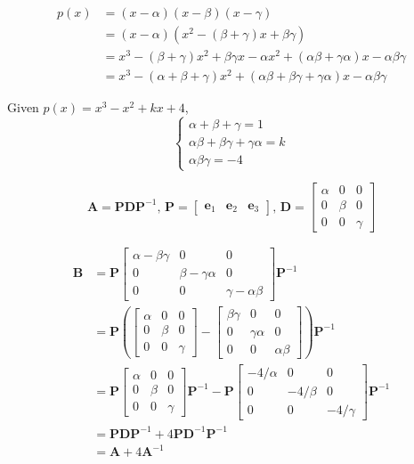 \documentclass[a4paper]{article}
\newcommand{\vv}{\mathbf}
\begin{document}
\[\begin{aligned}
	p(x)&=(x-\alpha)(x-\beta)(x-\gamma)\\
	    &=(x-\alpha)\left(x^2-(\beta+\gamma)x+\beta\gamma\right)\\
	    &=x^3-(\beta+\gamma)x^2+\beta\gamma x-\alpha x^2+(\alpha\beta+\gamma\alpha)x-\alpha\beta\gamma\\
	    &=x^3-(\alpha+\beta+\gamma)x^2+(\alpha\beta+\beta\gamma+\gamma\alpha)x-\alpha\beta\gamma
\end{aligned}\]

Given \(p(x)=x^3-x^2+kx+4\),
\[\begin{cases}
	\alpha+\beta+\gamma=1\\
	\alpha\beta+\beta\gamma+\gamma\alpha=k\\
	\alpha\beta\gamma=-4
\end{cases}\]

\[\vv A=\vv P\vv D\vv P^{-1},\,
	\vv P=\begin{bmatrix}\vv e_1&\vv e_2&\vv e_3\end{bmatrix},\,
	\vv D=\begin{bmatrix}\alpha&0&0\\0&\beta&0\\0&0&\gamma\end{bmatrix}\]

\[\begin{aligned}
	\vv B&=\vv P\begin{bmatrix}
		\alpha-\beta\gamma&0&0\\
		0&\beta-\gamma\alpha&0\\
		0&0&\gamma-\alpha\beta
	\end{bmatrix}\vv P^{-1}\\
	     &=\vv P\left(\begin{bmatrix}
		\alpha&0&0\\
		0&\beta&0\\
		0&0&\gamma
	\end{bmatrix}-\begin{bmatrix}
		\beta\gamma&0&0\\
		0&\gamma\alpha&0\\
		0&0&\alpha\beta
\end{bmatrix}\right)\vv P^{-1}\\
	     &=\vv P\begin{bmatrix}
		\alpha&0&0\\
		0&\beta&0\\
		0&0&\gamma
		\end{bmatrix}\vv P^{-1}-\vv P\begin{bmatrix}
		-4/\alpha&0&0\\
		0&-4/\beta&0\\
		0&0&-4/\gamma
\end{bmatrix}\vv P^{-1}\\
	     &=\vv P\vv D\vv P^{-1}+4\vv P\vv D^{-1}\vv P^{-1}\\
	     &=\boxed{\vv A+4\vv A^{-1}}
\end{aligned}\]
\end{document}
